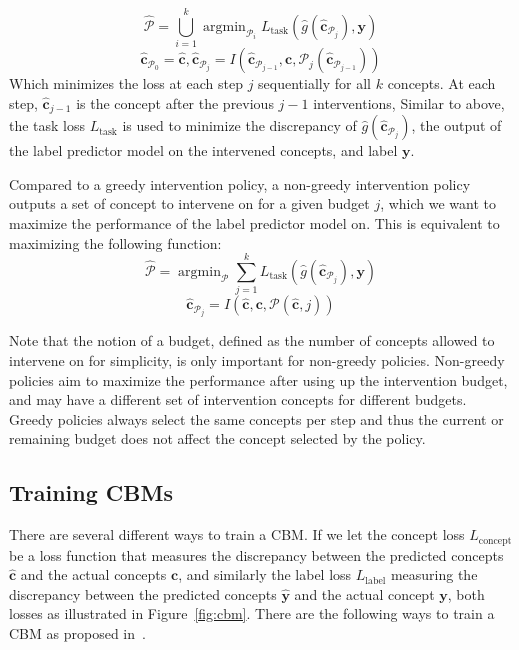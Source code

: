 \documentclass[../main.tex]{subfiles}
\begin{document}
\[\hat{\mathcal{P}} = \bigcup_{i=1}^k \mathop{\mathrm{argmin}}_{\mathcal{P}_i} L_{\text{task}}(\hat{g}(\hat{\mathbf{c}}_{\mathcal{P}_j}), \mathbf{y}) \]
\[\hat{\mathbf{c}}_{\mathcal{P}_0} = \hat{\mathbf{c}}, \hat{\mathbf{c}}_{\mathcal{P}_j} = I(\hat{\mathbf{c}}_{\mathcal{P}_{j-1}}, \mathbf{c}, \mathcal{P}_j(\hat{\mathbf{c}}_{\mathcal{P}_{j-1}}))\]
Which minimizes the loss at each step $j$ sequentially
for all $k$ concepts. At each
step, $\hat{\mathbf{c}}_{j-1}$ is 
the concept after the previous $j-1$ interventions,
Similar to above, the task loss $L_{\text{task}}$ is used to minimize
the discrepancy of $\hat{g}(\hat{\mathbf{c}}_{\mathcal{P}_j})$, 
the output of the label predictor model on the intervened concepts,
and label $\mathbf{y}$.

Compared to a greedy intervention policy, a non-greedy intervention 
policy outputs a set of concept to intervene on for a given budget $j$,
which we want to maximize the performance of the 
label predictor model on. This is equivalent to maximizing the following 
function:
\[\hat{\mathcal{P}} = \mathop{\mathrm{argmin}}_{\mathcal{P}} \sum_{j=1}^k L_{\text{task}}(\hat{g}(\hat{\mathbf{c}}_{\mathcal{P}_j}), \mathbf{y}) \]
\[\hat{\mathbf{c}}_{\mathcal{P}_j} = I(\hat{\mathbf{c}}, \mathbf{c}, \mathcal{P}(\hat{\mathbf{c}}, j))\]

Note that the notion of a budget, defined as the number
of concepts allowed to intervene on for simplicity, is only
important for non-greedy policies. Non-greedy policies aim
to maximize the performance after using up the intervention budget,
and may have a different set of intervention concepts 
for different budgets. Greedy policies always select the same
concepts per step and thus the current or remaining budget does not 
affect the concept selected by the policy.

\subsection{Training CBMs}

There are several different ways to train a CBM. 
If we let the concept loss $L_{\text{concept}}$ be a loss
 function that measures
the discrepancy between the predicted concepts $\hat{\mathbf{c}}$
and the actual concepts $\mathbf{c}$, and similarly the 
label loss $L_{\text{label}}$ measuring the discrepancy
between the predicted concepts $\hat{\mathbf{y}}$
and the actual concept $\mathbf{y}$,
both losses as illustrated in Figure~\ref{fig:cbm}.
There are the following ways
to train a CBM as proposed in~\cite{cbm}.
\end{document}
